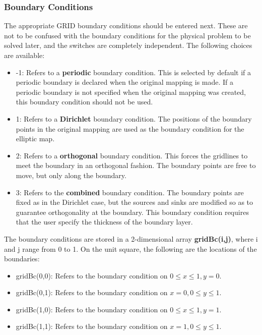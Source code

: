 \subsubsection{Boundary Conditions}
The appropriate GRID boundary conditions should be entered next.
These are not to be confused with the boundary conditions for the physical problem
to be solved later, and the switches are completely independent.  The following
choices are available:

\begin{itemize}
 \item -1:  Refers to a {\bf periodic} boundary condition.  This
  is selected by default if a periodic boundary is declared when the original mapping
  is made.  If a 
  periodic boundary is not specified when the original mapping was created, this boundary
  condition should not be used.
 \item  1:  Refers to a {\bf Dirichlet} boundary condition.  The positions of the boundary 
  points in the original mapping are used as the boundary condition for the elliptic map.
 \item  2:  Refers to a {\bf orthogonal} boundary condition.  This forces the gridlines to  
  meet the boundary in an orthogonal fashion.  The boundary points are free to move, but
  only along the boundary.
 \item  3:  Refers to the {\bf combined} boundary condition.  The boundary points are fixed
  as in the Dirichlet case, but the sources and sinks are modified so as to guarantee 
  orthogonality at the boundary.  This boundary condition requires that the user 
  specify the thickness of the boundary layer.
\end{itemize}

The boundary conditions are stored in a 2-dimensional array {\bf gridBc(i,j)}, where
i and j range from 0 to 1.  On the unit square, the following are the locations of the 
boundaries:

\begin{itemize}
 \item gridBc(0,0):  Refers to the boundary condition on $0\leq x \leq1, y=0$.
 \item gridBc(0,1):  Refers to the boundary condition on $x=0, 0\leq y \leq1$.
 \item gridBc(1,0):  Refers to the boundary condition on $0\leq x \leq1, y=1$.
 \item gridBc(1,1):  Refers to the boundary condition on $x=1, 0\leq y \leq1$.
\end{itemize}
 

